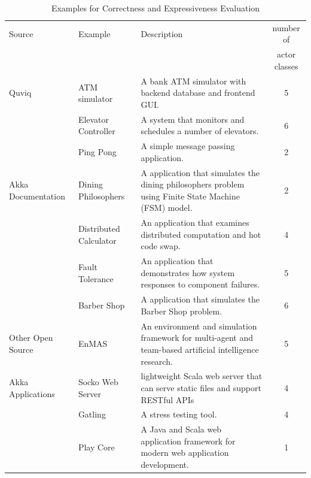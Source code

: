 \begin{table}[t]
\label{express_description}

\begin{center}
\begin{tabular}{| l | p{5 cm} | p{6.5 cm} | c | }
\hline

Source & Example & Description  & number of \\ 
              &                  &                        & actor classes\\
\hline
Quviq \cite{quviq} & ATM simulator & A bank ATM simulator with backend database
and frontend GUI. & 5 \\
\cline{2-4}
                                         & Elevator Controller &
A system that monitors and schedules a number of elevators. & 6 \\
\hline


                                                               & Ping Pong & A 
simple message passing application. & 2 \\
\cline{2-4}
Akka Documentation                     & Dining Philosophers & A application 
that simulates the
dining philosophers problem using Finite State Machine (FSM) model. & 2 \\
\cline{2-4}
  \cite{akka_doc}                             & Distributed Calculator  & An 
application that examines
distributed computation and hot code swap. & 4\\
\cline{2-4}
                                                     & Fault Tolerance & An 
application that demonstrates how system responses to component failures.  & 5\\
\hline

                                                    & Barber
Shop \cite{BarberShop} & A application that simulates the Barber
Shop problem.  & 6 \\
\cline{2-4}
Other Open Source             & EnMAS \cite{EnMAS} & An environment and 
simulation framework for
multi-agent and team-based artificial intelligence research. & 5\\
\cline{2-4}
  Akka Applications                & Socko Web Server \cite{SOCKO} & lightweight 
Scala web server that can
serve static files and support RESTful APIs & 4 \\
\cline{2-4}
                                                     & Gatling \cite{Gatling} &
A stress testing tool.  & 4 \\
\cline{2-4}
                                   & Play Core \cite{play_doc} &
A Java and Scala web application framework for modern web application 
development.  & 1 \\
\hline
\end{tabular}
\caption{Examples for Correctness and Expressiveness Evaluation}
\end{center}
\end{table}

